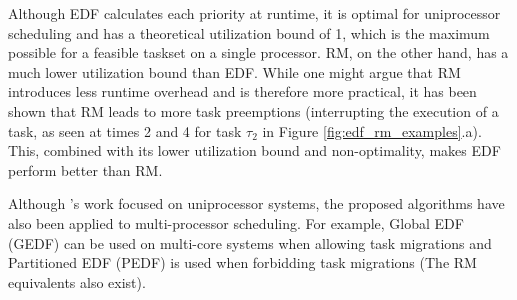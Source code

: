 Although EDF calculates each priority at runtime, it is optimal 
for uniprocessor scheduling and has a theoretical utilization bound 
of 1, which is the maximum possible for a feasible taskset on a 
single processor. RM, on the other hand, has a much lower 
utilization bound than EDF. While one might argue that RM introduces 
less runtime overhead and is therefore more practical, it has been 
shown that RM leads to more task preemptions (interrupting the 
execution of a task, as seen at times 2 and 4 for task $\tau_2$ in 
Figure \ref{fig:edf_rm_examples}.a). This, combined with its lower 
utilization bound and non-optimality, makes EDF perform better than 
RM\cite{buttazzo2005RMvsEDF}.

Although \cite{liu1973scheduling}'s work focused on uniprocessor 
systems, the proposed algorithms have also been applied to 
multi-processor scheduling.
For example, Global EDF (GEDF)
can be used on multi-core systems when allowing task migrations
and Partitioned EDF (PEDF) is used when forbidding task migrations
(The RM equivalents also exist).